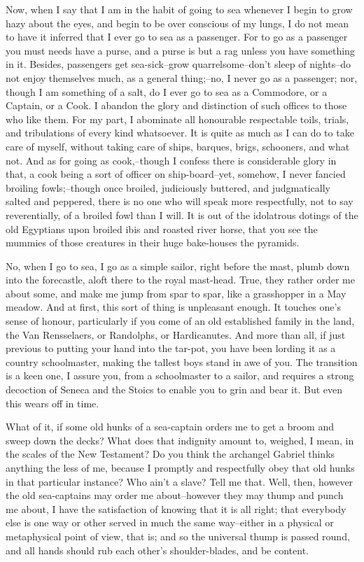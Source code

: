 Now, when I say that I am in the habit of going to sea whenever I
begin to grow hazy about the eyes, and begin to be over conscious of
my lungs, I do not mean to have it inferred that I ever go to sea as
a passenger. For to go as a passenger you must needs have a purse,
and a purse is but a rag unless you have something in it. Besides,
passengers get sea-sick--grow quarrelsome--don't sleep of nights--do
not enjoy themselves much, as a general thing;--no, I never go as a
passenger; nor, though I am something of a salt, do I ever go to sea
as a Commodore, or a Captain, or a Cook. I abandon the glory and
distinction of such offices to those who like them. For my part, I
abominate all honourable respectable toils, trials, and tribulations
of every kind whatsoever. It is quite as much as I can do to take
care of myself, without taking care of ships, barques, brigs,
schooners, and what not. And as for going as cook,--though I confess
there is considerable glory in that, a cook being a sort of officer
on ship-board--yet, somehow, I never fancied broiling fowls;--though
once broiled, judiciously buttered, and judgmatically salted and
peppered, there is no one who will speak more respectfully, not to
say reverentially, of a broiled fowl than I will. It is out of the
idolatrous dotings of the old Egyptians upon broiled ibis and roasted
river horse, that you see the mummies of those creatures in their
huge bake-houses the pyramids.

No, when I go to sea, I go as a simple sailor, right before the mast,
plumb down into the forecastle, aloft there to the royal mast-head.
True, they rather order me about some, and make me jump from spar to
spar, like a grasshopper in a May meadow. And at first, this sort of
thing is unpleasant enough. It touches one's sense of honour,
particularly if you come of an old established family in the land,
the Van Rensselaers, or Randolphs, or Hardicanutes. And more than
all, if just previous to putting your hand into the tar-pot, you have
been lording it as a country schoolmaster, making the tallest boys
stand in awe of you. The transition is a keen one, I assure you,
from a schoolmaster to a sailor, and requires a strong decoction of
Seneca and the Stoics to enable you to grin and bear it. But even
this wears off in time.

What of it, if some old hunks of a sea-captain orders me to get a
broom and sweep down the decks? What does that indignity amount to,
weighed, I mean, in the scales of the New Testament? Do you think
the archangel Gabriel thinks anything the less of me, because I
promptly and respectfully obey that old hunks in that particular
instance? Who ain't a slave? Tell me that. Well, then, however the
old sea-captains may order me about--however they may thump and punch
me about, I have the satisfaction of knowing that it is all right;
that everybody else is one way or other served in much the same
way--either in a physical or metaphysical point of view, that is; and
so the universal thump is passed round, and all hands should rub each
other's shoulder-blades, and be content.

